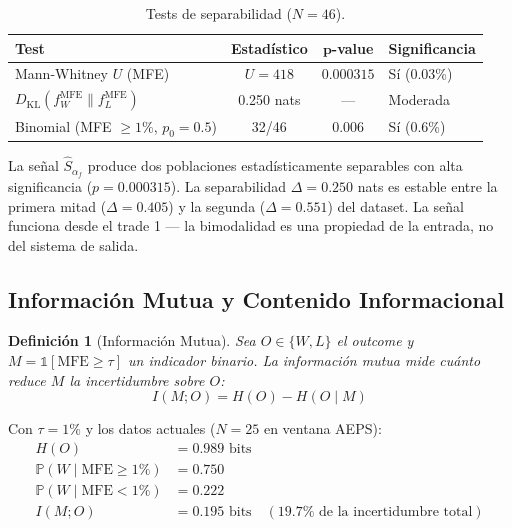 \documentclass[11pt,a4paper]{article}
\newtheorem{definition}{Definici\'on}[section]
\newcommand{\Prob}{\mathbb{P}}
\newcommand{\KL}{D_{\mathrm{KL}}}
\newcommand{\af}{\alpha_f}
\newcommand{\score}{\hat{S}_{\af}}
\begin{document}
\begin{table}[H]
\centering
\caption{Tests de separabilidad ($N=46$).}
\label{tab:sep_tests}
\begin{tabular}{lccl}
\toprule
\textbf{Test} & \textbf{Estad\'istico} & $\bm{p}$\textbf{-value} & \textbf{Significancia} \\
\midrule
Mann-Whitney $U$ (MFE) & $U = 418$ & $\bm{0.000315}$ & S\'i (0.03\%) \\
$\KL(f_W^{\text{MFE}} \| f_L^{\text{MFE}})$ & 0.250 nats & --- & Moderada \\
Binomial (MFE $\geq 1\%$, $p_0=0.5$) & 32/46 & $\bm{0.006}$ & S\'i (0.6\%) \\
\bottomrule
\end{tabular}
\end{table}

\begin{tcolorbox}[thmbox, title=Resultado 1: Bimodalidad Confirmada ($N=46$)]
La se\~nal $\score$ produce dos poblaciones estad\'isticamente
separables con alta significancia ($p = 0.000315$). La separabilidad
$\Delta = 0.250$ nats es estable entre la primera mitad ($\Delta = 0.405$)
y la segunda ($\Delta = 0.551$) del dataset. La se\~nal funciona
desde el trade 1 --- la bimodalidad es una propiedad de la entrada,
no del sistema de salida.
\end{tcolorbox}


\subsection{Informaci\'on Mutua y Contenido Informacional}

\begin{definition}[Informaci\'on Mutua]
Sea $O \in \{W, L\}$ el outcome y $M = \mathbb{1}[\text{MFE} \geq \tau]$
un indicador binario. La informaci\'on mutua \cite{cover2006elements}
mide cu\'anto reduce $M$ la incertidumbre sobre $O$:
\begin{equation}
I(M; O) = H(O) - H(O \mid M)
\end{equation}
\end{definition}

Con $\tau = 1\%$ y los datos actuales ($N=25$ en ventana AEPS):
\begin{align}
H(O) &= 0.989 \text{ bits} \\
\Prob(W \mid \text{MFE} \geq 1\%) &= 0.750 \\
\Prob(W \mid \text{MFE} < 1\%) &= 0.222 \\
I(M; O) &= 0.195 \text{ bits} \quad (19.7\% \text{ de la incertidumbre total})
\end{align}
\end{document}
